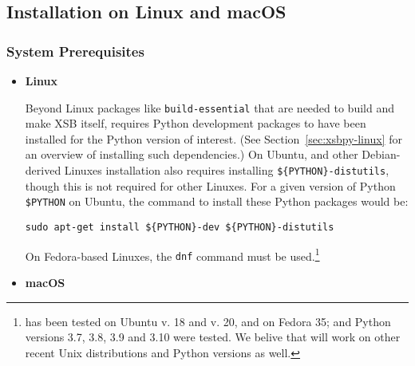 
\subsection{Installation on Linux and macOS}

\subsubsection{System Prerequisites}

\begin{itemize}
\item {\bf Linux}


Beyond Linux packages like {\tt build-essential} that are needed to
build and make XSB itself, \px{} requires Python development packages
to have been installed for the Python version of interest.  (See
Section~\ref{sec:xsbpy-linux} for an overview of installing such
dependencies.) On Ubuntu, and other Debian-derived Linuxes
installation also requires installing {\tt \$\{PYTHON\}-distutils},
though this is not required for other Linuxes. For a given version of
Python {\tt \$PYTHON} on Ubuntu, the command to install these Python
packages would be:

{\tt sudo apt-get install \$\{PYTHON\}-dev \$\{PYTHON\}-distutils}

On Fedora-based Linuxes, the {\tt dnf} command must be
used.\footnote{\px{} has been tested on Ubuntu v. 18 and v. 20, and on
  Fedora 35; and Python versions 3.7, 3.8, 3.9 and 3.10 were tested.
  We belive that \px{} will work on other recent Unix distributions
  and Python versions as well.}



\item {\bf macOS}
\end{itemize}

